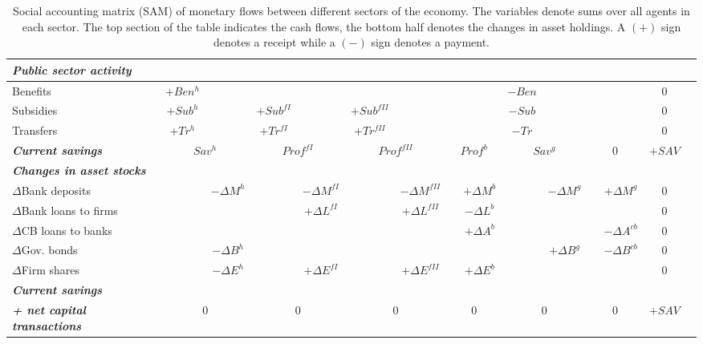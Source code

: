 \begin{landscape}
\begin{table}
\begin{tabular}{|l|c|c|c|c|c|c|c|c|c|c|c|c|c|c|}
\hline
\textbf{\emph{Public sector activity}}  &&&&&&&&&&&&&\\
\hline
    Benefits    & $+Ben^{h}$ & &  &             &  &               &  &   & $-Ben$  &  &  &  & 0\\\hline    
    Subsidies   & $+Sub^{h}$ & & $+Sub^{fI}$ &  & $+Sub^{fII}$  &  &  &   & $-Sub$  &  &  &  & 0\\\hline    
    Transfers   & $+Tr^{h}$  & & $+Tr^{fI}$  &  & $+Tr^{fII}$   &  &  &   & $-Tr$   &  &  &  & 0\\
    \hline
\textbf{\emph{Current savings}} &  \multicolumn{2}{c|}{$Sav^{h}$} &  \multicolumn{2}{c|}{$Prof^{fI}$} &  \multicolumn{2}{c|}{$Prof^{fII}$} &  \multicolumn{2}{c|}{$Prof^{b}$}  &  \multicolumn{2}{c|}{$Sav^{g}$} &  \multicolumn{2}{c|}{$0$} & $+SAV$\\
    \hline\hline
\textbf{\emph{Changes in asset stocks}}  &&&&&&&&&&&&&\\
    \hline
$\Delta$Bank deposits   & & $-\Delta M^h$ &  & $-\Delta M^{fI}$ & & $-\Delta M^{fII}$ & & $+\Delta M^b$ &  &  $-\Delta M^g$ & & $+\Delta M^g$ & 0\\\hline
$\Delta$Bank loans to firms  & & & & $+\Delta L^{fI}$ & & $+\Delta L^{fII}$  &  & $-\Delta L^b$ &  & & & & 0\\\hline
$\Delta$CB loans to banks  &               & &  & & &  & & $+\Delta A^b$   & & & & $-\Delta A^{cb}$ & 0\\\hline
$\Delta$Gov. bonds      & & $-\Delta B^{h}$  &  &  &   &   & &  & & $+\Delta B^g$  & & $-\Delta B^{cb}$ & 0\\\hline
$\Delta$Firm shares   & & $-\Delta E^{h}$   & & $+\Delta E^{fI}$ & & $+\Delta E^{fII}$ & & $+\Delta E^b$ & & & & & 0\\
    \hline
\textbf{\emph{Current savings}}  &&&&&&&&&&&&&\\
    \hline
\textbf{\emph{+ net capital transactions}}&  \multicolumn{2}{c|}{$0$} &  \multicolumn{2}{c|}{$0$} &  \multicolumn{2}{c|}{$0$} &  \multicolumn{2}{c|}{$0$}  &  \multicolumn{2}{c|}{$0$} &  \multicolumn{2}{c|}{$0$} & $+SAV$\\
    \hline\hline
  \end{tabular}
  \caption{Social accounting matrix (SAM) of monetary flows between different sectors of the economy. The variables denote sums over all agents in each sector. The top section of the table indicates the cash flows, the bottom half denotes the changes in asset holdings. A $(+)$ sign denotes a receipt while a $(-)$ sign denotes a payment.}
  \label{Accounting matrix: flows}
\end{table}
\end{landscape}

